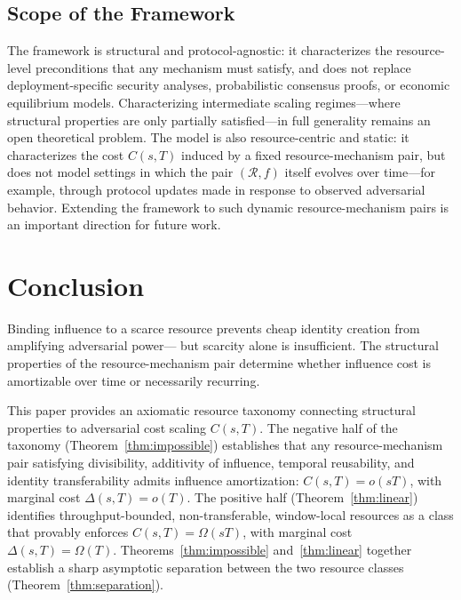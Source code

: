 \documentclass[manuscript,review]{acmart}
\theoremstyle{remark}
\begin{document}
	\subsection{Scope of the Framework}
	\label{ssec:lim_scope}
	
	The framework is structural and protocol-agnostic:
	it characterizes the resource-level preconditions
	that any mechanism must satisfy, and does not replace
	deployment-specific security analyses, probabilistic
	consensus proofs, or economic equilibrium models.
	Characterizing intermediate scaling regimes---where
	structural properties are only partially satisfied---in
	full generality remains an open theoretical problem.
	The model is also resource-centric and static: it
	characterizes the cost $C(s,T)$ induced by a fixed
	resource-mechanism pair, but does not model settings
	in which the pair $(\mathcal{R}, f)$ itself evolves
	over time---for example, through protocol updates
	made in response to observed adversarial behavior.
	Extending the framework to such dynamic
	resource-mechanism pairs is an important direction
	for future work.
	\section{Conclusion}
	\label{sec:conclusion}
	
	Binding influence to a scarce resource prevents cheap
	identity creation from amplifying adversarial power---
	but scarcity alone is insufficient.
	The structural properties of the resource-mechanism pair
	determine whether influence cost is amortizable over time
	or necessarily recurring.
	
	This paper provides an axiomatic resource taxonomy
	connecting structural properties to adversarial cost
	scaling $C(s,T)$.
	The negative half of the taxonomy (Theorem~\ref{thm:impossible})
	establishes that any resource-mechanism pair satisfying
	divisibility, additivity of influence, temporal reusability,
	and identity transferability admits influence amortization:
	$C(s,T) = o(sT)$, with marginal cost $\Delta(s,T) = o(T)$.
	The positive half (Theorem~\ref{thm:linear}) identifies
	throughput-bounded, non-transferable, window-local resources
	as a class that provably enforces $C(s,T) = \Omega(sT)$,
	with marginal cost $\Delta(s,T) = \Omega(T)$.
	Theorems~\ref{thm:impossible} and~\ref{thm:linear}
	together establish a sharp asymptotic separation
	between the two resource classes
	(Theorem~\ref{thm:separation}).
	
\end{document}
